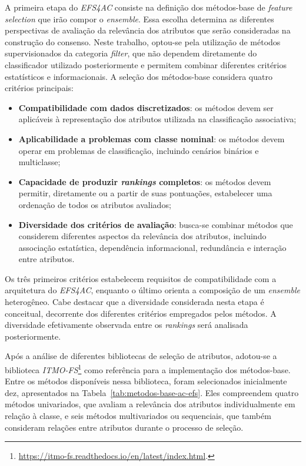 A primeira etapa do \textit{EFS4AC} consiste na definição dos métodos-base de \textit{feature selection} que irão compor o \textit{ensemble}. Essa escolha determina as diferentes perspectivas de avaliação da relevância dos atributos que serão consideradas na construção do consenso. Neste trabalho, optou-se pela utilização de métodos supervisionados da categoria \textit{filter}, que não dependem diretamente do classificador utilizado posteriormente e permitem combinar diferentes critérios estatísticos e informacionais. A seleção dos métodos-base considera quatro critérios principais:
\begin{itemize}
    \item \textbf{Compatibilidade com dados discretizados}: os métodos devem ser aplicáveis à representação dos atributos utilizada na classificação associativa;

    \item \textbf{Aplicabilidade a problemas com classe nominal}: os métodos devem operar em problemas de classificação, incluindo cenários binários e multiclasse;

    \item \textbf{Capacidade de produzir \textit{rankings} completos}: os métodos devem permitir, diretamente ou a partir de suas pontuações, estabelecer uma ordenação de todos os atributos avaliados;

    \item \textbf{Diversidade dos critérios de avaliação}: busca-se combinar métodos que considerem diferentes aspectos da relevância dos atributos, incluindo associação estatística, dependência informacional, redundância e interação entre atributos.
\end{itemize}

Os três primeiros critérios estabelecem requisitos de compatibilidade com a arquitetura do \textit{EFS4AC}, enquanto o último orienta a composição de um \textit{ensemble} heterogêneo. Cabe destacar que a diversidade considerada nesta etapa é conceitual, decorrente dos diferentes critérios empregados pelos métodos. A diversidade efetivamente observada entre os \textit{rankings} será analisada posteriormente.

Após a análise de diferentes bibliotecas de seleção de atributos, adotou-se a biblioteca \textit{ITMO-FS}\footnote{\url{https://itmo-fs.readthedocs.io/en/latest/index.html}.} como referência para a implementação dos métodos-base. Entre os métodos disponíveis nessa biblioteca, foram selecionados inicialmente dez, apresentados na Tabela~\ref{tab:metodos-base-ac-efs}. Eles compreendem quatro métodos univariados, que avaliam a relevância dos atributos individualmente em relação à classe, e seis métodos multivariados ou sequenciais, que também consideram relações entre atributos durante o processo de seleção.

